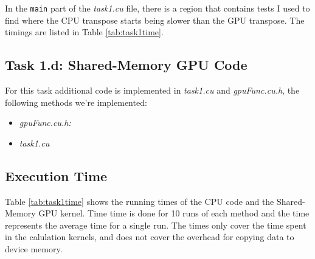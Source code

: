 In the \texttt{main} part of the \textit{task1.cu} file, there is a region that
contains tests I used to find where the CPU transpose starts being slower than
the GPU transpose. The timings are listed in Table \ref{tab:task1time}.


\subsection{Task 1.d: Shared-Memory GPU Code}
For this task additional code is implemented in \textit{task1.cu} and
\textit{gpuFunc.cu.h}, the following methods we're implemented:
\begin{itemize}
    \item \textit{gpuFunc.cu.h:}

    \item \textit{task1.cu}
\end{itemize}

\subsection{Execution Time}

Table \ref{tab:task1time} shows the running times of the CPU code and the
Shared-Memory GPU kernel. Time time is done for 10 runs of each method and the
time represents the average time for a single run. The times only cover the time
spent in the calulation kernels, and does not cover the overhead for copying
data to device memory.

